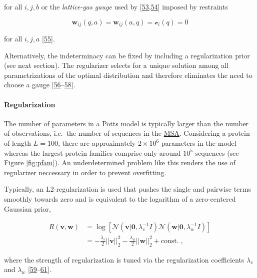 \documentclass[12pt,a4paper,twoside]{book}
\renewcommand{\v}{\mathbf{v}}
\newcommand{\vi}{\mathcal{v}_{i}}
\newcommand{\w}{\mathbf{w}}
\newcommand{\wij}{\mathbf{w}_{ij}}
\theoremstyle{definition}
\theoremstyle{definition}
\theoremstyle{remark}
\begin{document}
for all \(i,j,b\) or the \emph{lattice-gas gauge} used by
{[}\protect\hyperlink{ref-Morcos2011}{53},\protect\hyperlink{ref-Marks2011}{54}{]}
imposed by restraints

\begin{equation}
    \wij(q,a) = \wij(a,q) = \vi(q) = 0
\label{eq:ising-gauge}
\end{equation}

for all \(i,j,a\) {[}\protect\hyperlink{ref-Cocco2017}{55}{]}.

Alternatively, the indeterminacy can be fixed by including a
regularization prior (see next section). The regularizer selects for a
unique solution among all parametrizations of the optimal distribution
and therefore eliminates the need to choose a gauge
{[}\protect\hyperlink{ref-Koller2009}{56}--\protect\hyperlink{ref-Stein2015a}{58}{]}.

\paragraph{Regularization}\label{regularization}

The number of parameters in a Potts model is typically larger than the
number of observations, i.e.~the number of sequences in the
\protect\hyperlink{abbrev}{MSA}. Considering a protein of length
\(L=100\), there are approximately \(2 \times 10^6\) parameters in the
model whereas the largest protein families comprise only around \(10^5\)
sequences (see Figure \ref{fig:pfam}). An underdetermined problem like
this renders the use of regularizer neccessary in order to prevent
overfitting.

Typically, an L2-regularization is used that pushes the single and
pairwise terms smoothly towards zero and is equivalent to the logarithm
of a zero-centered Gaussian prior,

\begin{align}
  R(\v, \w)  &= \log \left[ \mathcal{N}(\v | \mathbf{0}, \lambda_v^{-1} I) \mathcal{N}(\w | \mathbf{0}, \lambda_w^{-1} I) \right] \\
             &= -\frac{\lambda_v}{2} ||\v||_2^2 - \frac{\lambda_w}{2} ||\w||_2^2 + \text{const.} \; ,
\label{eq:l2-reg}
\end{align}

where the strength of regularization is tuned via the regularization
coefficients \(\lambda_v\) and \(\lambda_w\)
{[}\protect\hyperlink{ref-Seemayer2014}{59}--\protect\hyperlink{ref-Kamisetty2013}{61}{]}.
\end{document}
